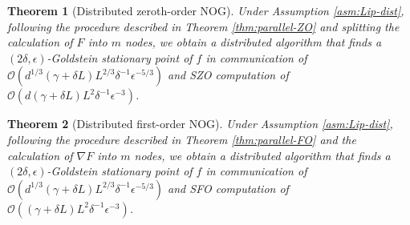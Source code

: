 \documentclass{article}
\def\vu{{\bm{u}}}
\def\vx{{\bm{x}}}
\def\gO{{\mathcal{O}}}
\def\sB{{\mathbb{B}}}
\newtheorem{thm}{Theorem}[section]
\theoremstyle{definition}
\theoremstyle{remark}
\begin{document}
	
	
	
	
	
	\begin{thm}[Distributed zeroth-order NOG] \label{thm:dist-ZO}
		Under Assumption \ref{asm:Lip-dist},
		following the procedure described in Theorem \ref{thm:parallel-ZO} and splitting the calculation of $F$ into $m$ nodes, we obtain a distributed algorithm that finds a $(2\delta,\epsilon)$-Goldstein stationary point of $f$ in  communication of
		$\gO(d^{1/3} (\gamma + \delta L) L^{2/3} \delta^{-1} \epsilon^{-5/3})$ and SZO computation of
		$\gO( d (\gamma + \delta L) L^2 \delta^{-1} \epsilon^{-3}  )$.
	\end{thm}
	
	\begin{thm}[Distributed first-order NOG] \label{thm:dist-FO}
		Under Assumption \ref{asm:Lip-dist},
		following the procedure described in Theorem \ref{thm:parallel-FO} and the calculation of $\nabla F$ into $m$ nodes, we obtain a distributed algorithm that finds a $(2\delta,\epsilon)$-Goldstein stationary point of $f$ in  communication of
		$\gO(d^{1/3} (\gamma + \delta L) L^{2/3} \delta^{-1} \epsilon^{-5/3})$ and SFO computation of
		$\gO( (\gamma + \delta L) L^2 \delta^{-1} \epsilon^{-3} )$.
	\end{thm}
	
\end{document}
